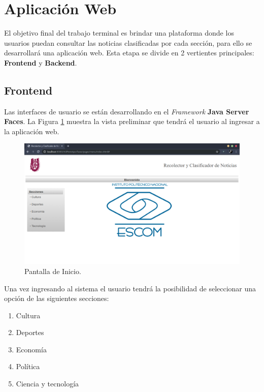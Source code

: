 \section{Aplicación Web}

El objetivo final del trabajo terminal es brindar una plataforma donde los usuarios puedan consultar las noticias clasificadas por cada sección, para ello se desarrollará una aplicación web. Esta etapa se divide en 2 vertientes principales: \textbf{Frontend} y \textbf{Backend}.

\subsection{Frontend}

Las interfaces de usuario se están desarrollando en el \textit{Framework} \textbf{Java Server Faces}. La Figura \ref{fig:PantallaInicio} muestra la vista preliminar que tendrá el usuario al ingresar a la aplicación web.

\begin{figure}[ht]
\centering
\includegraphics[scale=0.3]{imagenes/Aplicacion/PantallaInicio.png}
\caption{Pantalla de Inicio.}
\label{fig:PantallaInicio}
\end{figure}

Una vez ingresando al sistema el usuario tendrá la posibilidad de seleccionar una opción de las siguientes secciones: 

\begin{enumerate}
	\item Cultura
	\item Deportes
	\item Economía
	\item Política
	\item Ciencia y tecnología
\end{enumerate} 

